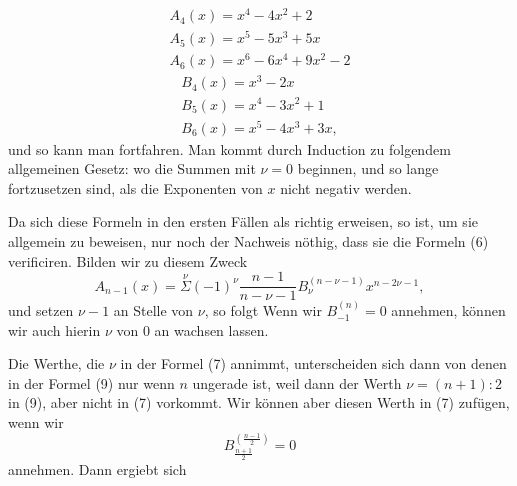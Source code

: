 
\[
\begin{gathered}
A_4(x) = x^4 - 4x^2 + 2\\
A_5(x) = x^5 - 5x^3 + 5x\\
A_6(x) = x^6 - 6x^4 + 9x^2 - 2
\end{gathered}
\]
\[
\begin{gathered}
B_4(x) = x^3 - 2x\\
B_5(x) = x^4 - 3x^2 + 1\\
B_6(x) = x^5 - 4x^3 + 3x,
\end{gathered}
\]
und so kann man fortfahren. Man kommt durch Induction zu folgendem allgemeinen Gesetz:
wo die Summen mit $\nu=0$ beginnen, und so lange fortzusetzen sind, als die Exponenten von $x$ nicht negativ werden.

Da sich diese Formeln in den ersten Fällen als richtig erweisen, so ist, um sie allgemein zu beweisen, nur noch der Nachweis nöthig, dass sie die Formeln (6) verificiren. Bilden wir zu diesem Zweck
\[
A_{n-1}(x) = \overset{\nu}{\Sigma}(-1)^\nu \dfrac{n-1}{n-\nu-1} B_\nu^{(n-\nu-1)} x^{n-2\nu-1},
\]
und setzen $\nu-1$ an Stelle von $\nu$, so folgt
Wenn wir $B_{-1}^{(n)} = 0$ annehmen, können wir auch hierin $\nu$ von 0 an wachsen lassen.

Die Werthe, die $\nu$ in der Formel (7) annimmt, unterscheiden sich dann von denen in der Formel (9) nur wenn $n$ ungerade ist, weil dann der Werth $\nu = (n+1):2$ in (9), aber nicht in (7) vorkommt. Wir können aber diesen Werth in (7) zufügen, wenn wir
\[
B_{\frac{n+1}{2}}^{\left(\frac{n-1}{2}\right)} = 0
\]
annehmen. Dann ergiebt sich
